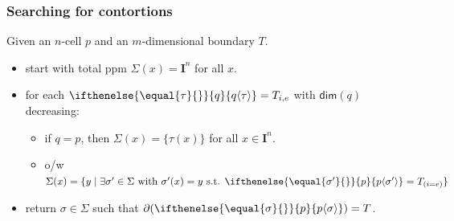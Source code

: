 \documentclass[xetex, mathserif, serif]{beamer}
\newcommand{\mdef}{:=}
\newcommand{\pint}[1]{\mathbf{I}^{#1}}
\newcommand{\pintrestr}[3]{\mathbf{I}^{#1}_{{#2}={#3}}}
\newcommand{\izero}{{\scriptstyle\mathbf{0}}}
\newcommand{\ione}{{\scriptstyle\mathbf{1}}}
\newcommand{\restrict}[2]{{#1}|_{#2}}
\renewcommand{\dim}[1]{\mathsf{dim}({#1})}
\newcommand{\cont}[2]{ \ifthenelse{\equal{#2}{}}{#1}{{#1}\langle{#2}\rangle} }
\newcommand{\boundary}[1]{\partial({#1})}
\begin{document}
\begin{frame}
  \frametitle{Searching for contortions}

  Given an $n$-cell $p$ and an $m$-dimensional boundary $T$.

  \begin{itemize}
  \item start with total ppm $\Sigma(x) = \pint{n}$ for all $x$.
  \item for each $\cont{q}{\tau} = T_{i,e}$ with $\dim{q}$ decreasing:
    \begin{itemize}
    \item if $q = p$, then $\Sigma(x) = \{ \tau(x) \}$ for all $x \in \pint{n}$.
    \item o/w $\Sigma(x) = \{ y \mid \exists \sigma' \in \Sigma \text{
        with } \sigma'(x) = y \text{ s.t. } \cont{p}{\sigma'} = T_{(i=e)} \}$
    \end{itemize}
  \item return $\sigma \in \Sigma$ such that $\boundary{\cont{p}{\sigma}} = T$.
  \end{itemize}



\end{frame}
\end{document}
